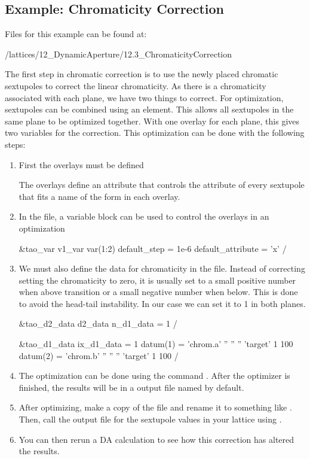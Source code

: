 \documentclass{hitec}     %
\begin{document}
{{{{%
\subsection{Example: Chromaticity Correction}

Files for this example can be found at: 
\begin{code}
/lattices/12_DynamicAperture/12.3_ChromaticityCorrection
\end{code}
The first step in chromatic correction is to use the newly placed chromatic sextupoles to correct the linear chromaticity. As there is a chromaticity associated with each plane, we have two things to correct. For optimization, sextupoles can be combined using an  element. This allows all sextupoles in the same plane to be optimized together. With one overlay for each plane, this gives two variables for the correction. This optimization can be done with the following steps:

\begin{enumerate}[leftmargin=*]
\item First the overlays must be defined

The overlays define an attribute  that controls the  attribute of every sextupole that fits a name of the form in each overlay. 
\item In the  file, a variable block can be used to control the overlays in an optimization
\begin{code}
&tao_var
    v1_var%
    var(1:2)%
    default_step = 1e-6
    default_attribute = 'x'
/
\end{code}
\item We must also define the data for chromaticity in the  file. Instead of correcting setting the chromaticity to zero, it is usually set to a small positive number when above transition or a small negative number when below. This is done to avoid the head-tail instability. In our case we can set it to 1 in both planes.
\begin{code}
&tao_d2_data
    d2_data%
    n_d1_data = 1
/

&tao_d1_data
    ix_d1_data = 1
    datum(1) = 'chrom.a' '' '' '' 'target' 1 100
    datum(2) = 'chrom.b' '' '' '' 'target' 1 100
/
\end{code}
\item The optimization can be done using the command . After the optimizer is finished, the results will be in a output file named  by default.
\item After optimizing, make a copy of the  file and rename it to something like . Then, call the output file for the sextupole values in your lattice using .
\item You can then rerun a DA calculation to see how this correction has altered the results.
\end{enumerate}


}}}}
\end{document}
